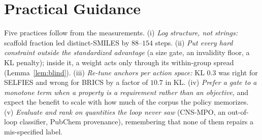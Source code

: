 \documentclass[10pt,letterpaper]{article}
\begin{document}
\section{Practical Guidance}
Five practices follow from the measurements. (i) \emph{Log structure, not strings:} scaffold fraction led distinct-SMILES by $88$--$154$ steps. (ii) \emph{Put every hard constraint outside the standardized advantage} (a size gate, an invalidity floor, a KL penalty); inside it, a weight acts only through its within-group spread (Lemma~\ref{lem:blind}). (iii) \emph{Re-tune anchors per action space:} KL $0.3$ was right for SELFIES and wrong for BRICS by a factor of $10.7$ in KL. (iv) \emph{Prefer a gate to a monotone term when a property is a requirement rather than an objective,} and expect the benefit to scale with how much of the corpus the policy memorizes. (v) \emph{Evaluate and rank on quantities the loop never saw} (CNS-MPO, an out-of-loop classifier, PubChem provenance), remembering that none of them repairs a mis-specified label.
\end{document}
